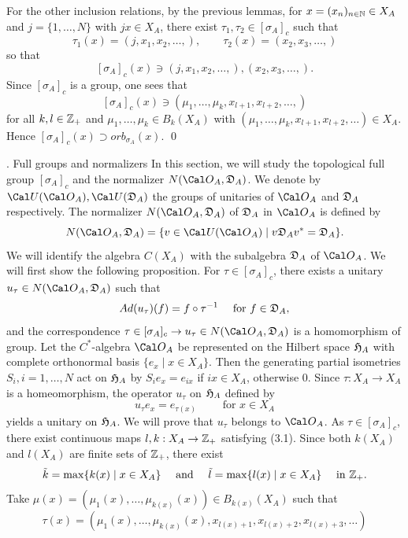 For the other inclusion relations,
by the previous lemmas,
for $x = (x_n )_{n \in \Bbb N} \in X_A$
and $j =\{1,\dots,N\}$ with $jx \in X_A$,
there exist
$\tau_1, \tau_2 \in [\sigma_A]_c$
such that
$$
\tau_1(x) = (j,x_1, x_2,\dots, ), \qquad
\tau_2(x) = (x_2, x_3,\dots, )
$$
so that
$$
[\sigma_A]_c(x) \ni (j,x_1, x_2,\dots, ),  (x_2, x_3,\dots, ).
$$  
Since $[\sigma_A]_c$ is a group, 
one sees that
$$
[\sigma_A]_c(x) \ni (\mu_1,\dots,\mu_k, x_{l+1},x_{l+2}, \dots, )
$$
for all $k,l\in { {\Bbb Z}_+ }$ 
and 
$\mu_1,\dots,\mu_k \in B_k(X_A)$
with
$(\mu_1,\dots,\mu_k, x_{l+1},x_{l+2},\dots ) \in X_A$.
Hence
$
[\sigma_A]_c (x) \supset orb_{\sigma_A}(x).
$
\qed
\enddemo

. Full groups and normalizers  
\endheading
In this section, we will study 
the topological full group $[\sigma_A]_c$ and the normalizer 
$N(\OA,\DA)$.
We denote by ${\Cal U}(\OA), {\Cal U}(\DA)$ the groups of unitaries of
$\OA$ and ${{\frak D}_A}$ respectively.
The normalizer $N(\OA,\DA)$ of ${{\frak D}_A}$ in $\OA$ is defined by
$$
N(\OA,\DA) = \{ v \in {\Cal U}(\OA) \mid v \DA v^* = \DA \}.
$$
We will identify the algebra $C(X_A)$ with the subalgebra 
${{\frak D}_A}$ of $\OA$.  
We will first show the following proposition. 
For $\tau \in [\sigma_A]_c$, 
there exists a unitary $u_\tau \in N(\OA,\DA)$
such that
$$
Ad(u_\tau)(f) = f \circ \tau^{-1}
\quad
\text{ for } f \in {{\frak D}_A},
$$
and the correspondence 
$\tau \in [\sigma_A]_c \rightarrow u_\tau \in N(\OA,\DA)$  
is a homomorphism of group. 
\endproclaim
{}
Let the $C^*$-algebra $\OA$ be represented on the Hilbert space
${\frak H}_A$ with complete orthonormal basis 
$\{ e_x\mid x \in X_A\}$.
Then the generating partial isometries $S_i, i=1,\dots,N$ 
act on ${{\frak H}_A}$ 
by 
 $S_i e_x = e_{ix}$ if $ix\in X_A$, otherwise $0$.
Since
 $\tau: X_A \rightarrow X_A$ is a homeomorphism,
 the operator $u_\tau$ on ${{\frak H}_A}$ defined by 
 $$
 u_\tau e_x = e_{\tau(x)} \qquad \text{ for } x \in X_A
$$
yields a unitary on ${{\frak H}_A}$.
We will prove that $u_\tau $ belongs to $\OA$.
As $\tau \in [\sigma_A]_c$, there exist
continuous maps
$l,k:X_A \rightarrow { {\Bbb Z}_+ }$
satisfying (3.1).
Since both $k(X_A)$ and $l(X_A)$ are finite sets 
of ${ {\Bbb Z}_+ }$, there exist
$$
\tilde{k} = \max\{k(x) \mid x \in X_A \} \quad 
\text{ and }\quad
\tilde{l} = \max\{l(x) \mid x \in X_A \}\quad
\text{ in }
{ {\Bbb Z}_+ }.
$$
Take 
$\mu(x) = (\mu_1(x),\dots, \mu_{k(x)}(x)) \in B_{k(x)}(X_A)$
such that
$$
\tau(x) = (\mu_1(x),\dots, \mu_{k(x)}(x),x_{l(x) +1},x_{l(x) +2},x_{l(x) +3},\dots)
$$
